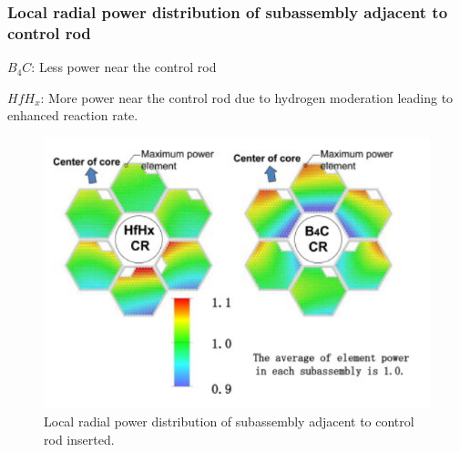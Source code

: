 \documentclass[9pt]{beamer}
\newcommand{\hfh}{$HfH_{x}$\xspace}
\newcommand{\bc}{$B_4C$\xspace}
\begin{document}
\begin{frame}
\frametitle{Local radial power distribution of subassembly adjacent to control rod}
\bc: Less power near the control rod

\hfh: More power near the control rod due to hydrogen moderation leading
to enhanced reaction rate.

\begin{figure}[htbp!]
  \begin{center}
      \includegraphics[scale=0.3]{./images/local.png}
  \end{center}
  \caption{Local radial power distribution of subassembly adjacent to control rod inserted.}
  \label{fig:local}
\end{figure}
\end{frame}

\end{document}
